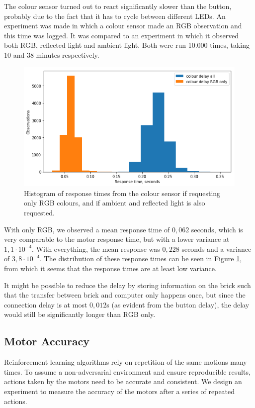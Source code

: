 \documentclass[11pt, a4paper]{article}
\begin{document}
The colour sensor turned out to react significantly slower than the button, probably due to the fact that it has to cycle between different LEDs. An experiment was made in which a colour sensor made an RGB observation and this time was logged. It was compared to an experiment in which it observed both RGB, reflected light and ambient light. Both were run 10.000 times, taking 10 and 38 minutes respectively.

\begin{figure}[H]
	\centering
	\includegraphics[scale=0.7]{images/colour_response_histogram.png} 	
	\caption{Histogram of  response times from the colour sensor if requesting only RGB colours, and if ambient and reflected light is also requested.}
	\label{fig:responsetimecolour}
\end{figure}
With only RGB, we observed a mean response time of $0,062$ seconds, which is very comparable to the motor response time, but with a lower variance at $1,1\cdot 10^{-4}$. With everything, the mean response was $0,228$ seconds and a variance of $3,8 \cdot 10^{-4}$. The distribution of these response times can be seen in Figure \ref{fig:responsetimecolour}, from which it seems that the response times are at least low variance.

It might be possible to reduce the delay by storing information on the brick such that the transfer between brick and computer only happens once, but since the connection delay is at most $0,012$s (as evident from the button delay), the delay would still be significantly longer than RGB only.


\subsection{Motor Accuracy}
Reinforcement learning algorithms rely on repetition of the same motions many times. To assume a non-adversarial environment and ensure reproducible results, actions taken by the motors need to be accurate and consistent. We design an experiment to measure the accuracy of the motors after a series of repeated actions.
\end{document}
